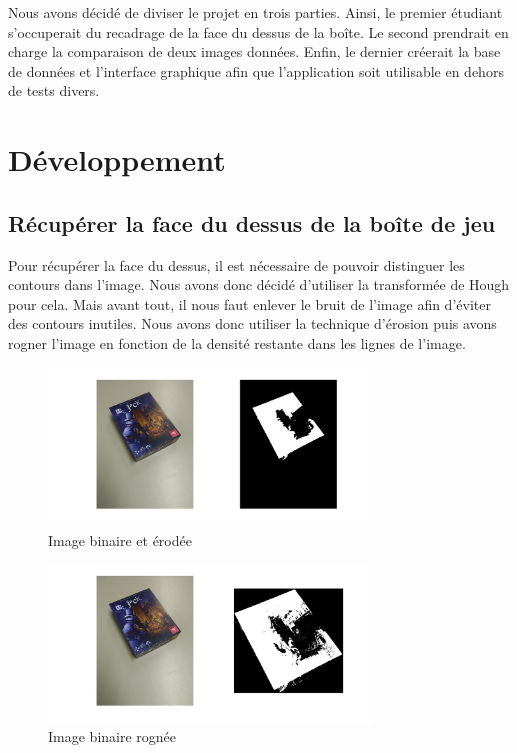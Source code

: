 \documentclass{st50_template}
\begin{document}
Nous avons décidé de diviser le projet en trois parties. Ainsi, le premier étudiant s'occuperait du recadrage de la face du dessus de la boîte. Le second prendrait en charge la comparaison de deux images données. Enfin, le dernier créerait la base de données et l'interface graphique afin que l'application soit utilisable en dehors de tests divers.


\section{Développement}

\subsection{Récupérer la face du dessus de la boîte de jeu}
Pour récupérer la face du dessus, il est nécessaire de pouvoir distinguer les contours dans l'image. Nous avons donc décidé d'utiliser la transformée de Hough pour cela. Mais avant tout, il nous faut enlever le bruit de l'image afin d'éviter des contours inutiles. Nous avons donc utiliser la technique d'érosion puis avons rogner l'image en fonction de la densité restante dans les lignes de l'image.

\begin{figure}[ht]
    \centering
    \includegraphics[width=0.77\textwidth]{images/erosion.jpg}
    \caption{Image binaire et érodée}
    \label{erosion}
\end{figure}

\begin{figure}[ht]
    \centering
    \includegraphics[width=0.77\textwidth]{images/rognage.jpg}
    \caption{Image binaire rognée}
    \label{rognage}
\end{figure}
\end{document}
